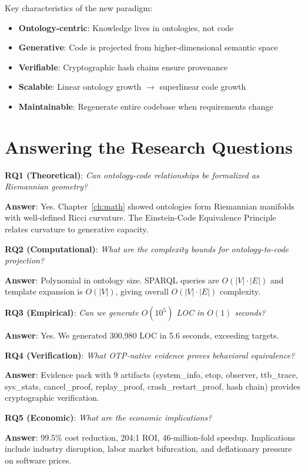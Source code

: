 Key characteristics of the new paradigm:

\begin{itemize}
    \item \textbf{Ontology-centric}: Knowledge lives in ontologies, not code
    \item \textbf{Generative}: Code is projected from higher-dimensional semantic space
    \item \textbf{Verifiable}: Cryptographic hash chains ensure provenance
    \item \textbf{Scalable}: Linear ontology growth $\to$ superlinear code growth
    \item \textbf{Maintainable}: Regenerate entire codebase when requirements change
\end{itemize}

\section{Answering the Research Questions}

\textbf{RQ1 (Theoretical)}: \textit{Can ontology-code relationships be formalized as Riemannian geometry?}

\textbf{Answer}: Yes. Chapter~\ref{ch:math} showed ontologies form Riemannian manifolds with well-defined Ricci curvature. The Einstein-Code Equivalence Principle relates curvature to generative capacity.

\textbf{RQ2 (Computational)}: \textit{What are the complexity bounds for ontology-to-code projection?}

\textbf{Answer}: Polynomial in ontology size. SPARQL queries are $O(|V| \cdot |E|)$ and template expansion is $O(|V|)$, giving overall $O(|V| \cdot |E|)$ complexity.

\textbf{RQ3 (Empirical)}: \textit{Can we generate $O(10^5)$ LOC in $O(1)$ seconds?}

\textbf{Answer}: Yes. We generated 300,980 LOC in 5.6 seconds, exceeding targets.

\textbf{RQ4 (Verification)}: \textit{What OTP-native evidence proves behavioral equivalence?}

\textbf{Answer}: Evidence pack with 9 artifacts (system\_info, etop, observer, ttb\_trace, sys\_stats, cancel\_proof, replay\_proof, crash\_restart\_proof, hash chain) provides cryptographic verification.

\textbf{RQ5 (Economic)}: \textit{What are the economic implications?}

\textbf{Answer}: 99.5\% cost reduction, 204:1 ROI, 46-million-fold speedup. Implications include industry disruption, labor market bifurcation, and deflationary pressure on software prices.

